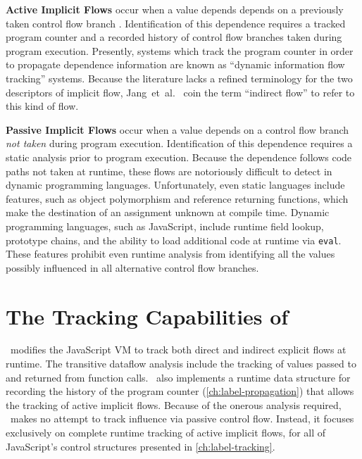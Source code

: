 \begin{description}
\item{
\textbf{Active Implicit Flows} occur when a value depends depends on a previously taken control flow branch .
Identification of this dependence requires a tracked program counter and a recorded history of control flow branches taken during program execution.
Presently, systems which track the program counter in order to propagate dependence information are known as ``dynamic information flow tracking'' systems.
Because the literature lacks a refined terminology for the two descriptors of implicit flow, Jang~et~al.~\cite{jang.etal+10} coin the term ``indirect flow'' to refer to this kind of flow.
}

\item{
\textbf{Passive Implicit Flows} occur when a value depends on a control flow branch \emph{not taken} during program execution.
Identification of this dependence requires a static analysis prior to program execution.
Because the dependence follows code paths not taken at runtime, these flows are notoriously difficult to detect in dynamic programming languages.
Unfortunately, even static languages include features, such as object polymorphism and reference returning functions, which make the destination of an assignment unknown at compile time.
Dynamic programming languages, such as JavaScript, include runtime field lookup, prototype chains, and the ability to load additional code at runtime via \texttt{eval}.
These features prohibit even runtime analysis from identifying all the values possibly influenced in all alternative control flow branches.
}

\end{description}

\section{The Tracking Capabilities of \FlowCore}
\label{sec:tracking-capabilities}

\FlowCore\ modifies the JavaScript VM to track both direct and indirect explicit flows at runtime.
The transitive dataflow analysis include the tracking of values passed to and returned from function calls.
\FlowCore\ also implements a runtime data structure for recording the history of the program counter (\autoref{ch:label-propagation}) that allows the tracking of active implicit flows.
Because of the onerous analysis required, \FlowCore\ makes no attempt to track influence via passive control flow.
Instead, it focuses exclusively on complete runtime tracking of active implicit flows, for all of JavaScript's control structures presented in \autoref{ch:label-tracking}.
